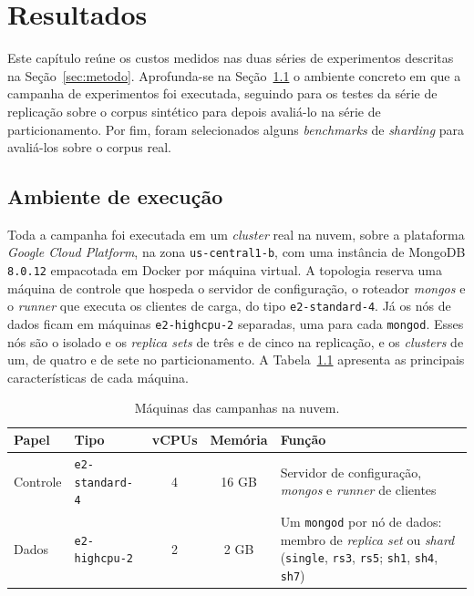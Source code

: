 \chapter{Resultados}
\label{cap:resultados}

Este capítulo reúne os custos medidos nas duas séries de experimentos descritas na Seção~\ref{sec:metodo}. Aprofunda-se na Seção~\ref{sec:res-ambiente} o ambiente concreto em que a campanha de experimentos foi executada, seguindo para os testes da série de replicação sobre o corpus sintético para depois avaliá-lo na série de particionamento. Por fim, foram selecionados alguns \textit{benchmarks} de \textit{sharding} para avaliá-los sobre o corpus real.

\section{Ambiente de execução}
\label{sec:res-ambiente}

Toda a campanha foi executada em um \textit{cluster} real na nuvem, sobre a plataforma \textit{Google Cloud Platform}, na zona \texttt{us-central1-b}, com uma instância de MongoDB \texttt{8.0.12} empacotada em Docker por máquina virtual. A topologia reserva uma máquina de controle que hospeda o servidor de configuração, o roteador \textit{mongos} e o \textit{runner} que executa os clientes de carga, do tipo \texttt{e2-standard-4}. Já os nós de dados ficam em máquinas \texttt{e2-highcpu-2} separadas, uma para cada \texttt{mongod}. Esses nós são o isolado e os \textit{replica sets} de três e de cinco na replicação, e os \textit{clusters} de um, de quatro e de sete no particionamento. A Tabela~\ref{tab:res-maquinas} apresenta as principais características de cada máquina.

\begin{table}[htb]
  \centering
  \caption{Máquinas das campanhas na nuvem.}
  \label{tab:res-maquinas}
  \begin{tabular}{@{}l l c c >{\raggedright\arraybackslash}p{5.4cm}@{}}
    \toprule
    Papel & Tipo & vCPUs & Memória & Função \\
    \midrule
    Controle & \texttt{e2-standard-4} & 4 & 16 GB & Servidor de configuração, \textit{mongos} e \textit{runner} de clientes \\
    Dados    & \texttt{e2-highcpu-2} & 2 & 2 GB  & Um \texttt{mongod} por nó de dados: membro de \textit{replica set} ou \textit{shard} (\texttt{single}, \texttt{rs3}, \texttt{rs5}; \texttt{sh1}, \texttt{sh4}, \texttt{sh7}) \\
    \bottomrule
  \end{tabular}
\end{table}

